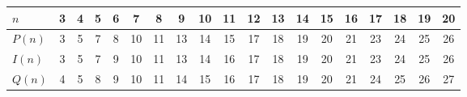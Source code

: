 \begin{center}
    \begin{tabular}{|l|c|c|c|c|c|c|c|c|c|c|c|c|c|c|c|c|c|c|}
        \hline
        $n$ & 3 & 4 & 5 & 6 & 7 & 8 & 9 & 10 & 11 & 12 & 13 & 14 & 15 & 16 & 17 & 18 & 19 & 20  \\ 
        \hline
        $P(n)$ & 3  & 5 & 7 & 8 & 10 & 11 & 13 & 14 & 15 & 17 & 18 & 19 & 20 & 21 & 23 & 24 & 25 & 26 \\ 
        \hline
        $I(n)$ & 3  & 5 & 7 & 9 & 10 & 11 & 13 & 14 & 16 & 17 & 18 & 19 & 20 & 21 & 23 & 24 & 25 & 26 \\ 
        \hline
        $Q(n)$ & 4  & 5 & 8 & 9 & 10 & 11 & 14 & 15 & 16 & 17 & 18 & 19 & 20 & 21 & 24 & 25 & 26 & 27 \\ 
        \hline
    \end{tabular}
\end{center}
